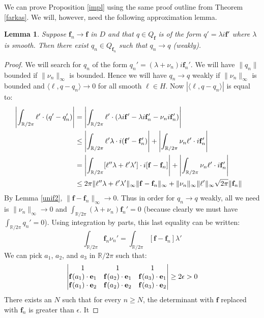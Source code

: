 \documentclass{amsart}
\newcommand{\R}			{\mathbb R}
\newcommand{\f}			{\mathbf f}
\newcommand{\e}			{\mathbf e}
\newtheorem{lemma}[theorem]{Lemma}
\numberwithin{equation}{section}
\begin{document}
We can prove Proposition \ref{impl} using the same proof outline 
from Theorem \ref{farkas}.  We will, however, need the following 
approximation lemma.

\begin{lemma}\label{approx}
Suppose $\f_n\to\f$ in $D$ and that $q\in Q_\f$ is of the form 
$q'=\lambda i\f'$ where $\lambda$ is smooth.  Then there exist 
$q_n\in Q_{\f_n}$ such that $q_n\to q$ (weakly).
\end{lemma}

\begin{proof}
We will search for $q_n$ of the form $q_n'=(\lambda+\nu_n)i\f_n'$.  
We will have $\|q_n\|$ bounded if $\|\nu_n\|_\infty$ is bounded.  
Hence we will have $q_n\to q$ weakly if $\|\nu_n\|_\infty$ is 
bounded and $\langle\ell,q-q_n\rangle\to 0$ for all smooth 
$\ell\in H$.  Now $|\langle\ell,q-q_n\rangle|$ is equal to:
\begin{equation}
\begin{split}
\left|\int_{\R/2\pi}\ell'\cdot(q'-q_n')\right|&=\left|\int_{\R/2\pi}\ell'\cdot
(\lambda i\f'-\lambda i\f_n'-\nu_n i\f_n')\right|\cr
&\leq\left|\int_{\R/2\pi}\ell'\lambda\cdot
i(\f'-\f_n')\right|+\left|\int_{\R/2\pi}\nu_n\ell'\cdot i\f_n'\right|\cr
&=\left|\int_{\R/2\pi}[\ell''\lambda+\ell'\lambda']\cdot
i[\f-\f_n]\right|+\left|\int_{\R/2\pi}\nu_n\ell'\cdot i\f_n'\right|\cr
&\leq 2\pi\|\ell''\lambda+\ell'\lambda'\|_\infty\|\f-\f_n\|_\infty
+\|\nu_n\|_\infty\|\ell'\|_\infty\sqrt{2\pi}\|\f_n\|
\end{split}
\end{equation}
By Lemma \ref{unif2}, $\|\f-\f_n\|_\infty\to 0$.  Thus in order 
for $q_n\to q$ weakly, all we need is $\|\nu_n\|_\infty\to 0$ and 
$\int_{\R/2\pi}(\lambda+\nu_n)\f_n'=0$ (because clearly we 
must have $\int_{\R/2\pi}q_n'=0$).  Using integration 
by parts, this last equality can be written:
\begin{equation}\label{needforc}
\int_{\R/2\pi}\f_n\nu_n'=\int_{\R/2\pi}[\f-\f_n]\lambda'
\end{equation}
We can pick $a_1$, $a_2$, and $a_3$ in $\R/2\pi$ such that:
\begin{equation}
\left|\begin{matrix}1&1&1\cr\f(a_1)\cdot\e_1&\f(a_2)\cdot\e_1&\f(a_3)\cdot\e_1
\cr\f(a_1)\cdot\e_2&\f(a_2)\cdot\e_2&\f(a_3)\cdot\e_2\end{matrix}\right|\geq 2\epsilon>0
\end{equation}
There exists an $N$ such that for every $n\geq N$, the determinant 
with $\f$ replaced with $\f_n$ is greater than $\epsilon$.  It 

\end{proof}
\end{document}
